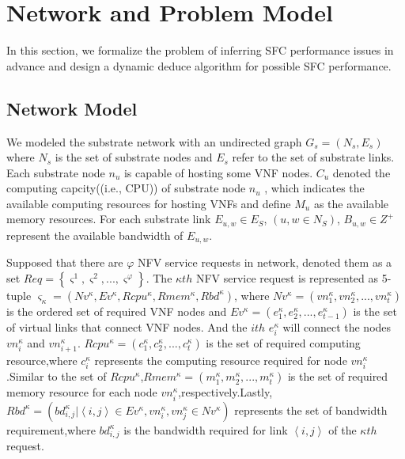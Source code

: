 \documentclass{ieeeaccess}
\begin{document}
\section{Network and Problem Model}
In this section, we formalize the problem of inferring SFC performance issues in advance and design a dynamic deduce algorithm for possible SFC performance.

\subsection{Network Model}
We modeled the substrate network with an undirected graph $G_{s}=\left ( N_{s},E_{s} \right )$ where $N_{s}$ is the set of substrate nodes and $E_{s}$ refer to the set of substrate links. Each substrate node $n_{u}$ is capable of hosting some VNF nodes. $C_{u}$ denoted the computing capcity((i.e., CPU)) of substrate node $n_{u}$ , which indicates the available computing resources for hosting VNFs and define $M_{u}$ as the available memory resources. For each substrate link $E_{u,w} \in E_{S}$, $(u,w \in N_{S})$, $ B_{u,w}\in Z^{+} $ represent  the available bandwidth of $E_{u,w}$.

Supposed that there are $\varphi$  NFV service requests in network, denoted them as a set $Req=\left \{ {\varsigma}^{1},{\varsigma}^{2},...,{\varsigma}^{\varphi}  \right \} $. The $\kappa th$ NFV service request is represented as 5-tuple  ${\varsigma }_{\kappa }=\left ( Nv^{\kappa},Ev^{\kappa},Rcpu^{\kappa},Rmem^{\kappa},Rbd^{\kappa} \right )$, where $Nv^{\kappa}=\left (vn_{1}^{\kappa},vn_{2}^{\kappa},...,vn_{t}^{\kappa} \right )$ is the ordered set of required VNF nodes and $Ev^{\kappa}=\left ( e_{1}^{\kappa},e_{2}^{\kappa},...,e_{t-1}^{\kappa} \right )$ is the set of virtual links that connect VNF nodes. And the $ith$ $e_{i}^{\kappa}$ will connect the nodes $vn_{i}^{\kappa}$ and $vn_{i+1}^{\kappa}$. $Rcpu^{\kappa}=\left ( c_{1}^{\kappa},c_{2}^{\kappa},...,c_{t}^{\kappa} \right )$ is the set of required computing resource,where $c_{i}^{\kappa}$   represents the computing resource required for node $vn_{i}^{\kappa}$.Similar to the set of $Rcpu^{\kappa}$,$Rmem^{\kappa}=\left ( m_{1}^{\kappa},m_{2}^{\kappa},...,m_{t}^{\kappa} \right )$ is the set of required memory resource for each node $vn_{i}^{\kappa}$,respectively.Lastly, $Rbd^{\kappa}=\left ( bd_{i,j}^{\kappa}|\left < i,j \right >\in Ev^{\kappa},vn_{i}^{\kappa},vn_{j}^{\kappa} \in Nv^{\kappa} \right )$ represents the set of bandwidth requirement,where $bd_{i,j}^{\kappa} $ is the bandwidth required for link $\left< i,j \right>$ of the ${\kappa th}$  request.
\end{document}
